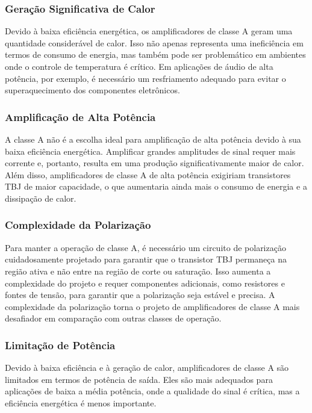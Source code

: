 \subsubsection{Geração Significativa de Calor}

Devido à baixa eficiência energética, os amplificadores de classe A geram uma quantidade considerável de calor. Isso não apenas representa uma ineficiência em termos de consumo de energia, mas também pode ser problemático em ambientes onde o controle de temperatura é crítico. Em aplicações de áudio de alta potência, por exemplo, é necessário um resfriamento adequado para evitar o superaquecimento dos componentes eletrônicos.

\subsubsection{Amplificação de Alta Potência}

A classe A não é a escolha ideal para amplificação de alta potência devido à sua baixa eficiência energética. Amplificar grandes amplitudes de sinal requer mais corrente e, portanto, resulta em uma produção significativamente maior de calor. Além disso, amplificadores de classe A de alta potência exigiriam transistores TBJ de maior capacidade, o que aumentaria ainda mais o consumo de energia e a dissipação de calor.

\subsubsection{Complexidade da Polarização}

Para manter a operação de classe A, é necessário um circuito de polarização cuidadosamente projetado para garantir que o transistor TBJ permaneça na região ativa e não entre na região de corte ou saturação. Isso aumenta a complexidade do projeto e requer componentes adicionais, como resistores e fontes de tensão, para garantir que a polarização seja estável e precisa. A complexidade da polarização torna o projeto de amplificadores de classe A mais desafiador em comparação com outras classes de operação.

\subsubsection{Limitação de Potência}

Devido à baixa eficiência e à geração de calor, amplificadores de classe A são limitados em termos de potência de saída. Eles são mais adequados para aplicações de baixa a média potência, onde a qualidade do sinal é crítica, mas a eficiência energética é menos importante.
